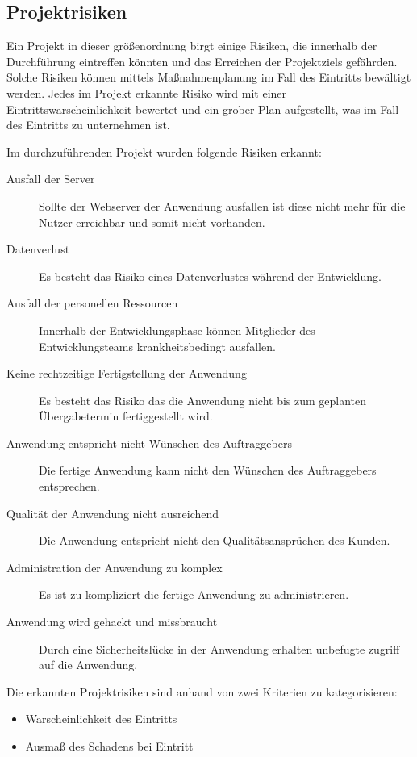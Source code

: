 \subsection{Projektrisiken}
\label{sec:Projektrisiken}

Ein Projekt in dieser größenordnung birgt einige Risiken, die innerhalb der
Durchführung eintreffen könnten und das Erreichen der Projektziels gefährden.
Solche Risiken können mittels Maßnahmenplanung im Fall des Eintritts bewältigt
werden. Jedes im Projekt erkannte Risiko wird mit einer
Eintrittswarscheinlichkeit bewertet und ein grober Plan aufgestellt, was im Fall
des Eintritts zu unternehmen ist.

Im durchzuführenden Projekt wurden folgende Risiken erkannt:

\begin{description}
\item[Ausfall der Server]
Sollte der Webserver der Anwendung ausfallen ist diese nicht mehr für die Nutzer
erreichbar und somit nicht vorhanden.
\item[Datenverlust]
Es besteht das Risiko eines Datenverlustes während der Entwicklung.
\item[Ausfall der personellen Ressourcen]
Innerhalb der Entwicklungsphase können Mitglieder des Entwicklungsteams
krankheitsbedingt ausfallen.
\item[Keine rechtzeitige Fertigstellung der Anwendung]
Es besteht das Risiko das die Anwendung nicht bis zum geplanten Übergabetermin
fertiggestellt wird.
\item[Anwendung entspricht nicht Wünschen des Auftraggebers]
Die fertige Anwendung kann nicht den Wünschen des Auftraggebers entsprechen.
\item[Qualität der Anwendung nicht ausreichend]
Die Anwendung entspricht nicht den Qualitätsansprüchen des Kunden.
\item[Administration der Anwendung zu komplex]
Es ist zu kompliziert die fertige Anwendung zu administrieren.
\item[Anwendung wird gehackt und missbraucht]
Durch eine Sicherheitslücke in der Anwendung erhalten unbefugte zugriff auf die
Anwendung. 
\end{description}

Die erkannten Projektrisiken sind anhand von zwei Kriterien zu kategorisieren:

\begin{itemize}
\item Warscheinlichkeit des Eintritts
\item Ausmaß des Schadens bei Eintritt 
\end{itemize}

